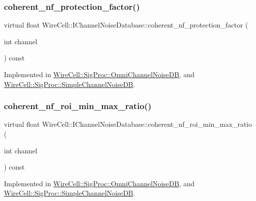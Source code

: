 \subsubsection{\texorpdfstring{coherent\+\_\+nf\+\_\+protection\+\_\+factor()}{coherent\_nf\_protection\_factor()}}
{\footnotesize\ttfamily virtual float Wire\+Cell\+::\+I\+Channel\+Noise\+Database\+::coherent\+\_\+nf\+\_\+protection\+\_\+factor (\begin{DoxyParamCaption}\item[{int}]{channel }\end{DoxyParamCaption}) const\hspace{0.3cm}{\ttfamily [pure virtual]}}



Implemented in \hyperlink{class_wire_cell_1_1_sig_proc_1_1_omni_channel_noise_d_b_aa4d6c9f3a30c788683caacf735510ceb}{Wire\+Cell\+::\+Sig\+Proc\+::\+Omni\+Channel\+Noise\+DB}, and \hyperlink{class_wire_cell_1_1_sig_proc_1_1_simple_channel_noise_d_b_aa17316b608537c3cf2c30ab600092bac}{Wire\+Cell\+::\+Sig\+Proc\+::\+Simple\+Channel\+Noise\+DB}.

\mbox{\label{class_wire_cell_1_1_i_channel_noise_database_a3fab0404aa8a10ad7ed2ac7afd2fe9a7}} 
\subsubsection{\texorpdfstring{coherent\+\_\+nf\+\_\+roi\+\_\+min\+\_\+max\+\_\+ratio()}{coherent\_nf\_roi\_min\_max\_ratio()}}
{\footnotesize\ttfamily virtual float Wire\+Cell\+::\+I\+Channel\+Noise\+Database\+::coherent\+\_\+nf\+\_\+roi\+\_\+min\+\_\+max\+\_\+ratio (\begin{DoxyParamCaption}\item[{int}]{channel }\end{DoxyParamCaption}) const\hspace{0.3cm}{\ttfamily [pure virtual]}}



Implemented in \hyperlink{class_wire_cell_1_1_sig_proc_1_1_omni_channel_noise_d_b_ae92b71da5d91c1069ba78d9658d97f8b}{Wire\+Cell\+::\+Sig\+Proc\+::\+Omni\+Channel\+Noise\+DB}, and \hyperlink{class_wire_cell_1_1_sig_proc_1_1_simple_channel_noise_d_b_a31eba95e77c824eb351f3ed4e5e58eac}{Wire\+Cell\+::\+Sig\+Proc\+::\+Simple\+Channel\+Noise\+DB}.

